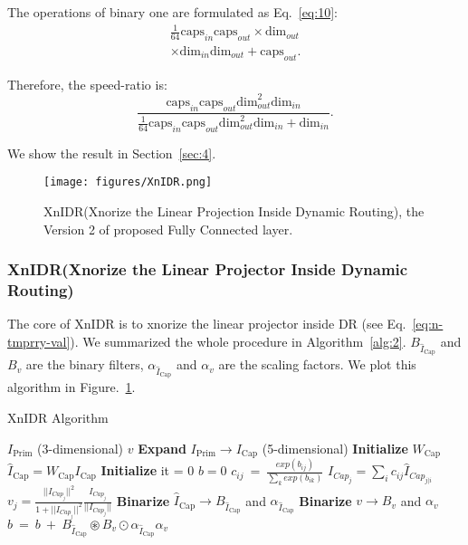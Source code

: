 \documentclass[sn-mathphys,iicol,Numbered]{sn-jnl}
\begin{document}
The operations of binary one are formulated as Eq.~\ref{eq:10}:
\begin{multline} \label{eq:10}
\frac{1}{64}\text{caps}_{in}\text{caps}_{out}\times \text{dim}_{out}\\ 
\times\text{dim}_{in}\text{dim}_{out}+\text{caps}_{out}.
\end{multline}

Therefore, the speed-ratio is:
\vspace{-0.4cm}
\begin{equation} \label{eq:11}
\frac{\text{caps}_{in}\text{caps}_{out}\text{dim}^{2}_{out}\text{dim}_{in}}{\frac{1}{64}\text{caps}_{in}\text{caps}_{out}\text{dim}^{2}_{out}\text{dim}_{in}+\text{dim}_{in}}.
\end{equation}

We show the result in Section~\ref{sec:4}.

\begin{figure} [ht]
\centering
\caption{XnIDR(Xnorize the Linear Projection Inside Dynamic Routing), the Version 2 of proposed Fully Connected layer.}
\texttt{[image: figures/XnIDR.png]}
\vspace{-0.7cm}
\label{fig:XnIDR}
\end{figure}

\subsubsection{XnIDR(Xnorize the Linear Projector Inside Dynamic Routing)}\label{sec:3.3.2}

The core of XnIDR is to xnorize the linear projector inside DR (see Eq.~\ref{eq:n-tmprry-val}). We summarized the whole procedure in Algorithm~\ref{alg:2}. $B_{\hat{I}_{\text{Cap}}}$ and $B_{v}$ are the binary filters, $\alpha_{\hat{I}_{\text{Cap}}}$ and $\alpha_{v}$ are the scaling factors. We plot this algorithm in Figure.~\ref{fig:XnIDR}.

\begin{algorithm*}[ht]\small
\caption{XnIDR Algorithm}
\begin{multicols}{2}
\begin{algorithmic}[1]
\INPUT $I_{\text{Prim}}$ (3-dimensional)
\OUTPUT $v$
\State \textbf{Expand} $I_{\text{Prim}} \rightarrow I_{\text{Cap}}$ (5-dimensional)
\State \textbf{Initialize} $W_{\text{Cap}}$
\State $\hat{I}_{\text{Cap}}=W_{\text{Cap}} I_{\text{Cap}}$
\State \textbf{Initialize} it = 0
\State $b=0$
\State $c_{ij}\ =\ \frac{exp(b_{ij})}{\sum_{k}exp(b_{ik})}$
\State $I_{Cap_{j}} = \sum_{i}c_{ij}\hat{I}_{Cap_{j|i}}$
\State $v_{j} = \frac{||I_{Cap_{j}}||^{2}}{1+||I_{Cap_{j}}||^{2}}\frac{I_{Cap_{j}}}{||I_{Cap_{j}}||}$
\State \textbf{Binarize} $\hat{I}_{\text{Cap}} \rightarrow B_{\hat{I}_{\text{Cap}}}$ and $\alpha_{\hat{I}_{\text{Cap}}}$
\State \textbf{Binarize} $v \rightarrow B_{v}$ and $\alpha_{v}$ 
\State $b\ =\ b\ +\ B_{\hat{I}_{\text{Cap}}}\circledast B_{v} \odot\alpha_{\hat{I}_{\text{Cap}}}\alpha_{v}$
\EndWhile
\end{algorithmic}
\end{multicols}
\label{alg:2}
\end{algorithm*}
\end{document}
